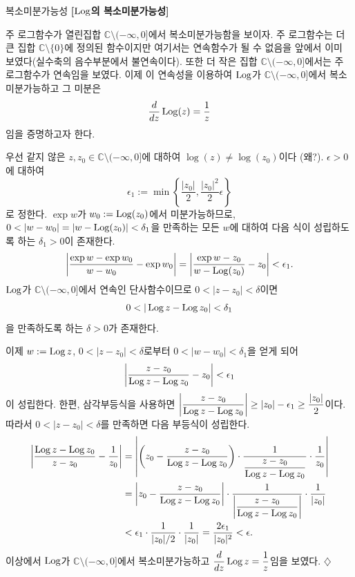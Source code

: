 \begin{saltexample}[label=example-2-9]{복소미분가능성}{} 
\textbf{[$\mathop{\mathrm{Log}}$의 복소미분가능성]} %

주 로그함수가 열린집합 $\mathbb C \setminus(-\infty,0]$에서
복소미분가능함을 보이자.
주 로그함수는 더 큰 집합 $\mathbb C \setminus\{0\}$에 정의된 함수이지만
여기서는 연속함수가 될 수 없음을 앞에서 이미 보였다(실수축의 음수부분에서 불연속이다).
또한 더 작은 집합 $\mathbb C \setminus(-\infty,0]$에서는 주 로그함수가 연속임을 보였다.
이제 이 연속성을 이용하여 $\mathop{\mathrm{Log}}$가 $\mathbb C \setminus(-\infty,0]$에서
복소미분가능하고 그 미분은
\[
\displaystyle\frac{d}{dz} \mathop{\mathrm{Log}} (z) = \displaystyle\frac 1z 
\]
임을 증명하고자 한다.

우선 같지 않은 $z, z_0 \in \mathbb C \setminus(-\infty,0]$에 대하여
$\log (z) \ne \log(z_0)$이다 (왜?).
$\epsilon>0$에 대하여
\[
\epsilon_1 := \min \left\{ \dfrac{|z_0|}2, \dfrac{|z_0|^2}2\epsilon \right\}
\]
로 정한다.
$\exp w$가 $w_0:=\mathop{\mathrm{Log}}(z_0)$에서 미분가능하므로,
$0<|w-w_0| = |w - \Log(z_0)| < \delta_1$을 만족하는 모든 $w$에 대하여
다음 식이 성립하도록 하는 $\delta_1>0$이 존재한다.
\[
\left| \displaystyle\frac{\exp w - \exp w_0}{w-w_0} - \exp w_0 \right|
= \left| \displaystyle\frac{\exp w - z_0}{w - \mathop{\mathrm{Log}}(z_0)} - z_0 \right| <\epsilon_1.
\]
$\mathop{\mathrm{Log}}$가 $\mathbb C \setminus(-\infty,0]$에서
연속인 단사함수이므로
$0<|z-z_0|<\delta$이면 
\[
0 < |\mathop{\mathrm{Log}} z - \mathop{\mathrm{Log}} z_0 | < \delta_1
\]
을 만족하도록 하는 $\delta>0$가 존재한다.

이제 $w:=\mathop{\mathrm{Log}} z$, $0<|z-z_0|<\delta$로부터
$0<|w-w_0|<\delta_1$을 얻게 되어
\[
\left| \displaystyle\frac{z-z_0}{\mathop{\mathrm{Log}} z - \mathop{\mathrm{Log}} z_0} - z_0 \right| < \epsilon_1
\]
이 성립한다.
한편, 삼각부등식을 사용하면
$ \left| \displaystyle\frac{z-z_0}{\mathop{\mathrm{Log}} z - \mathop{\mathrm{Log}} z_0} \right| \ge |z_0| - \epsilon_1 
\ge \displaystyle\frac{|z_0|}2$이다.
따라서 
$0<|z-z_0|<\delta$를 만족하면 다음 부등식이 성립한다.
\begin{align*}
\left| \displaystyle\frac{\mathop{\mathrm{Log}} z - \mathop{\mathrm{Log}} z_0}{z-z_0} - \displaystyle\frac1{z_0} \right|
&= \left| \left(z_0 - \displaystyle\frac{z-z_0}{\mathop{\mathrm{Log}} z - \mathop{\mathrm{Log}} z_0} \right)\cdot
\displaystyle\frac1{\displaystyle\frac{z-z_0}{\mathop{\mathrm{Log}} z - \mathop{\mathrm{Log}} z_0}}\cdot \displaystyle\frac1{z_0} \right| \\
&= \left| z_0 - \displaystyle\frac{z-z_0}{\mathop{\mathrm{Log}} z - \mathop{\mathrm{Log}} z_0} \right| \cdot
\displaystyle\frac1{\left|\displaystyle\frac{z-z_0}{\mathop{\mathrm{Log}} z - \mathop{\mathrm{Log}} z_0}\right|} \cdot
\displaystyle\frac1{|z_0|} \\
&< \epsilon_1 \cdot \displaystyle\frac1{|z_0|/2}\cdot \displaystyle\frac1{|z_0|} 
= \displaystyle\frac{2\epsilon_1}{|z_0|^2} < \epsilon.
\end{align*}
이상에서 $\mathop{\mathrm{Log}}$가 $\mathbb C \setminus (-\infty,0]$에서 복소미분가능하고
$\displaystyle\frac{d}{dz}\mathop{\mathrm{Log}} z = \displaystyle\frac 1z$임을 보였다.
\hfill $\diamondsuit$
\end{saltexample}

